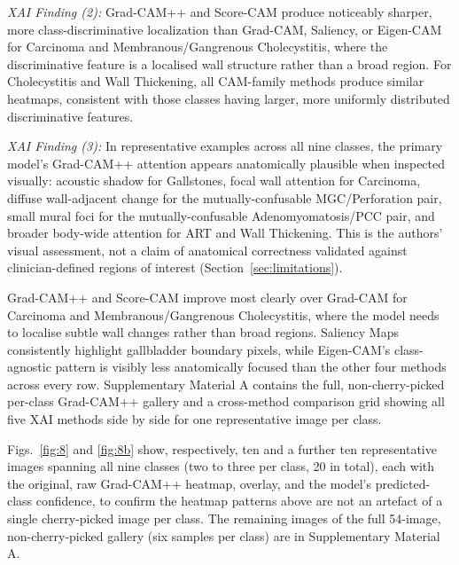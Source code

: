 \textit{XAI Finding (2):} Grad-CAM++ and Score-CAM produce noticeably sharper, more class-discriminative localization than Grad-CAM, Saliency, or Eigen-CAM for Carcinoma and Membranous/Gangrenous Cholecystitis, where the discriminative feature is a localised wall structure rather than a broad region. For Cholecystitis and Wall Thickening, all CAM-family methods produce similar heatmaps, consistent with those classes having larger, more uniformly distributed discriminative features.

\textit{XAI Finding (3):} In representative examples across all nine classes, the primary model's Grad-CAM++ attention appears anatomically plausible when inspected visually: acoustic shadow for Gallstones, focal wall attention for Carcinoma, diffuse wall-adjacent change for the mutually-confusable MGC/Perforation pair, small mural foci for the mutually-confusable Adenomyomatosis/PCC pair, and broader body-wide attention for ART and Wall Thickening. This is the authors' visual assessment, not a claim of anatomical correctness validated against clinician-defined regions of interest (Section~\ref{sec:limitations}).

Grad-CAM++ and Score-CAM improve most clearly over Grad-CAM for Carcinoma and Membranous/Gangrenous Cholecystitis, where the model needs to localise subtle wall changes rather than broad regions. Saliency Maps consistently highlight gallbladder boundary pixels, while Eigen-CAM's class-agnostic pattern is visibly less anatomically focused than the other four methods across every row. Supplementary Material A contains the full, non-cherry-picked per-class Grad-CAM++ gallery and a cross-method comparison grid showing all five XAI methods side by side for one representative image per class.

Figs.~\ref{fig:8} and \ref{fig:8b} show, respectively, ten and a further ten representative images spanning all nine classes (two to three per class, 20 in total), each with the original, raw Grad-CAM++ heatmap, overlay, and the model's predicted-class confidence, to confirm the heatmap patterns above are not an artefact of a single cherry-picked image per class. The remaining images of the full 54-image, non-cherry-picked gallery (six samples per class) are in Supplementary Material A.

